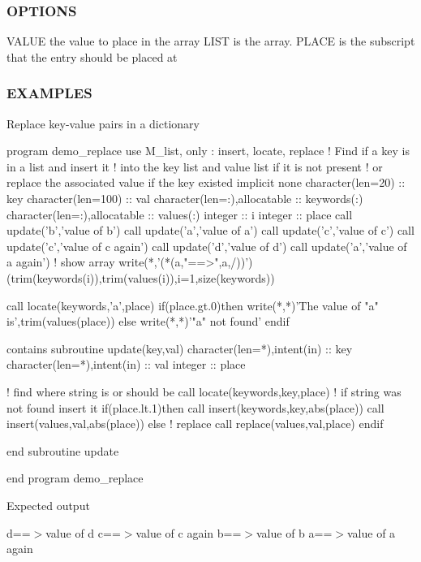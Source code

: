 \subsubsection*{O\+P\+T\+I\+O\+NS}

\begin{DoxyVerb}VALUE         the value to place in the array
LIST          is the array.
PLACE         is the subscript that the entry should be placed at
\end{DoxyVerb}


\subsubsection*{E\+X\+A\+M\+P\+L\+ES}

Replace key-\/value pairs in a dictionary \begin{DoxyVerb}program demo_replace
use M_list, only  : insert, locate, replace
! Find if a key is in a list and insert it
! into the key list and value list if it is not present
! or replace the associated value if the key existed
implicit none
character(len=20)            :: key
character(len=100)           :: val
character(len=:),allocatable :: keywords(:)
character(len=:),allocatable :: values(:)
integer                      :: i
integer                      :: place
call update('b','value of b')
call update('a','value of a')
call update('c','value of c')
call update('c','value of c again')
call update('d','value of d')
call update('a','value of a again')
! show array
write(*,'(*(a,"==>",a,/))')(trim(keywords(i)),trim(values(i)),i=1,size(keywords))

call locate(keywords,'a',place)
if(place.gt.0)then
   write(*,*)'The value of "a" is',trim(values(place))
else
   write(*,*)'"a" not found'
endif

contains
subroutine update(key,val)
character(len=*),intent(in)  :: key
character(len=*),intent(in)  :: val
integer                      :: place

! find where string is or should be
call locate(keywords,key,place)
! if string was not found insert it
if(place.lt.1)then
   call insert(keywords,key,abs(place))
   call insert(values,val,abs(place))
else ! replace
   call replace(values,val,place)
endif

end subroutine update
\end{DoxyVerb}
 end program demo\+\_\+replace

Expected output

d==$>$value of d c==$>$value of c again b==$>$value of b a==$>$value of a again

